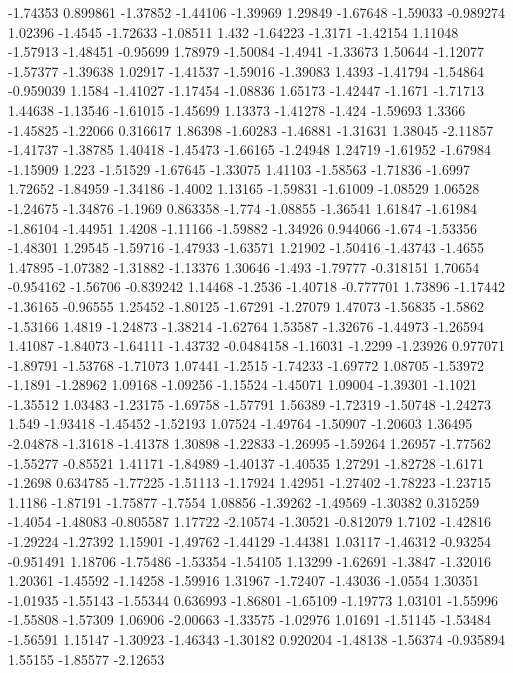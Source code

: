 \documentclass[9pt]{article}
\theoremstyle{plain}
\theoremstyle{definition}
\theoremstyle{remark}
\numberwithin{equation}{section}
\begin{document}
-1.74353
0.899861
-1.37852
-1.44106
-1.39969
1.29849
-1.67648
-1.59033
-0.989274
1.02396
-1.4545
-1.72633
-1.08511
1.432
-1.64223
-1.3171
-1.42154
1.11048
-1.57913
-1.48451
-0.95699
1.78979
-1.50084
-1.4941
-1.33673
1.50644
-1.12077
-1.57377
-1.39638
1.02917
-1.41537
-1.59016
-1.39083
1.4393
-1.41794
-1.54864
-0.959039
1.1584
-1.41027
-1.17454
-1.08836
1.65173
-1.42447
-1.1671
-1.71713
1.44638
-1.13546
-1.61015
-1.45699
1.13373
-1.41278
-1.424
-1.59693
1.3366
-1.45825
-1.22066
0.316617
1.86398
-1.60283
-1.46881
-1.31631
1.38045
-2.11857
-1.41737
-1.38785
1.40418
-1.45473
-1.66165
-1.24948
1.24719
-1.61952
-1.67984
-1.15909
1.223
-1.51529
-1.67645
-1.33075
1.41103
-1.58563
-1.71836
-1.6997
1.72652
-1.84959
-1.34186
-1.4002
1.13165
-1.59831
-1.61009
-1.08529
1.06528
-1.24675
-1.34876
-1.1969
0.863358
-1.774
-1.08855
-1.36541
1.61847
-1.61984
-1.86104
-1.44951
1.4208
-1.11166
-1.59882
-1.34926
0.944066
-1.674
-1.53356
-1.48301
1.29545
-1.59716
-1.47933
-1.63571
1.21902
-1.50416
-1.43743
-1.4655
1.47895
-1.07382
-1.31882
-1.13376
1.30646
-1.493
-1.79777
-0.318151
1.70654
-0.954162
-1.56706
-0.839242
1.14468
-1.2536
-1.40718
-0.777701
1.73896
-1.17442
-1.36165
-0.96555
1.25452
-1.80125
-1.67291
-1.27079
1.47073
-1.56835
-1.5862
-1.53166
1.4819
-1.24873
-1.38214
-1.62764
1.53587
-1.32676
-1.44973
-1.26594
1.41087
-1.84073
-1.64111
-1.43732
-0.0484158
-1.16031
-1.2299
-1.23926
0.977071
-1.89791
-1.53768
-1.71073
1.07441
-1.2515
-1.74233
-1.69772
1.08705
-1.53972
-1.1891
-1.28962
1.09168
-1.09256
-1.15524
-1.45071
1.09004
-1.39301
-1.1021
-1.35512
1.03483
-1.23175
-1.69758
-1.57791
1.56389
-1.72319
-1.50748
-1.24273
1.549
-1.93418
-1.45452
-1.52193
1.07524
-1.49764
-1.50907
-1.20603
1.36495
-2.04878
-1.31618
-1.41378
1.30898
-1.22833
-1.26995
-1.59264
1.26957
-1.77562
-1.55277
-0.85521
1.41171
-1.84989
-1.40137
-1.40535
1.27291
-1.82728
-1.6171
-1.2698
0.634785
-1.77225
-1.51113
-1.17924
1.42951
-1.27402
-1.78223
-1.23715
1.1186
-1.87191
-1.75877
-1.7554
1.08856
-1.39262
-1.49569
-1.30382
0.315259
-1.4054
-1.48083
-0.805587
1.17722
-2.10574
-1.30521
-0.812079
1.7102
-1.42816
-1.29224
-1.27392
1.15901
-1.49762
-1.44129
-1.44381
1.03117
-1.46312
-0.93254
-0.951491
1.18706
-1.75486
-1.53354
-1.54105
1.13299
-1.62691
-1.3847
-1.32016
1.20361
-1.45592
-1.14258
-1.59916
1.31967
-1.72407
-1.43036
-1.0554
1.30351
-1.01935
-1.55143
-1.55344
0.636993
-1.86801
-1.65109
-1.19773
1.03101
-1.55996
-1.55808
-1.57309
1.06906
-2.00663
-1.33575
-1.02976
1.01691
-1.51145
-1.53484
-1.56591
1.15147
-1.30923
-1.46343
-1.30182
0.920204
-1.48138
-1.56374
-0.935894
1.55155
-1.85577
-2.12653
\end{document}
